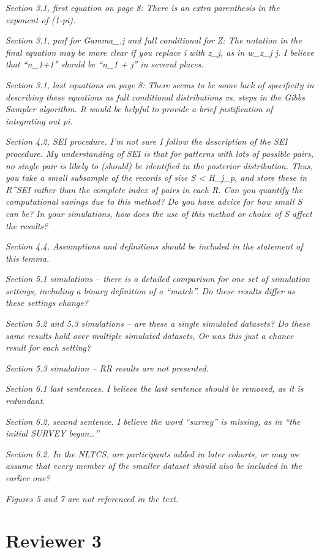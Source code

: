 \documentclass[letterpaper, parskip]{scrartcl}
\newcommand{\pointRaised}[1]{%
	\begin{tcolorbox}
		\itshape #1
	\end{tcolorbox}
}
\newcounter{responsectr}[section]     %
\begin{document}
		\pointRaised{%
Section 3.1, first equation on page 8: There is an extra parenthesis in the exponent of (1-pi).
}
		\pointRaised{%
Section 3.1, pmf for Gamma_{.j} and full conditional for Z: The notation in the final equation
may be more clear if you replace i with z_j, as in w_{z_j j}. I believe that “n_1+1” should be “n_1
+ j” in several places.
}
		\pointRaised{%
Section 3.1, last equations on page 8: There seems to be some lack of specificity in describing
these equations as full conditional distributions vs. steps in the Gibbs Sampler algorithm. It
would be helpful to provide a brief justification of integrating out pi.
}
		\pointRaised{%
Section 4.2, SEI procedure. I’m not sure I follow the description of the SEI procedure. My
understanding of SEI is that for patterns with lots of possible pairs, no single pair is likely to
(should) be identified in the posterior distribution. Thus, you take a small subsample of the
records of size S < H_j_p, and store these in R^{SEI} rather than the complete index of pairs in
each R. Can you quantify the computational savings due to this method? Do you have advice for
how small S can be? In your simulations, how does the use of this method or choice of S affect
the results?
}
		\pointRaised{%
Section 4.4, Assumptions and definitions should be included in the statement of this lemma.
}
		\pointRaised{%
Section 5.1 simulations – there is a detailed comparison for one set of simulation settings,
including a binary definition of a “match”. Do these results differ as these settings change?
}
		\pointRaised{%
Section 5.2 and 5.3 simulations – are these a single simulated datasets? Do these same results
hold over multiple simulated datasets, Or was this just a chance result for each setting?
}
		\pointRaised{%
Section 5.3 simulation – RR results are not presented.
}
		\pointRaised{%
	Section 6.1 last sentences. I believe the last sentence should be removed, as it is redundant.
}
		\pointRaised{%
Section 6.2, second sentence. I believe the word “survey” is missing, as in “the initial SURVEY
began…”
}
		\pointRaised{%
Section 6.2. In the NLTCS, are participants added in later cohorts, or may we assume that every
member of the smaller dataset should also be included in the earlier one?
}
		\pointRaised{%
	Figures 5 and 7 are not referenced in the text.
}



	\clearpage
	\newpage
	
	\section*{Reviewer 3}
	\setcounter{responsectr}{0}
\end{document}
